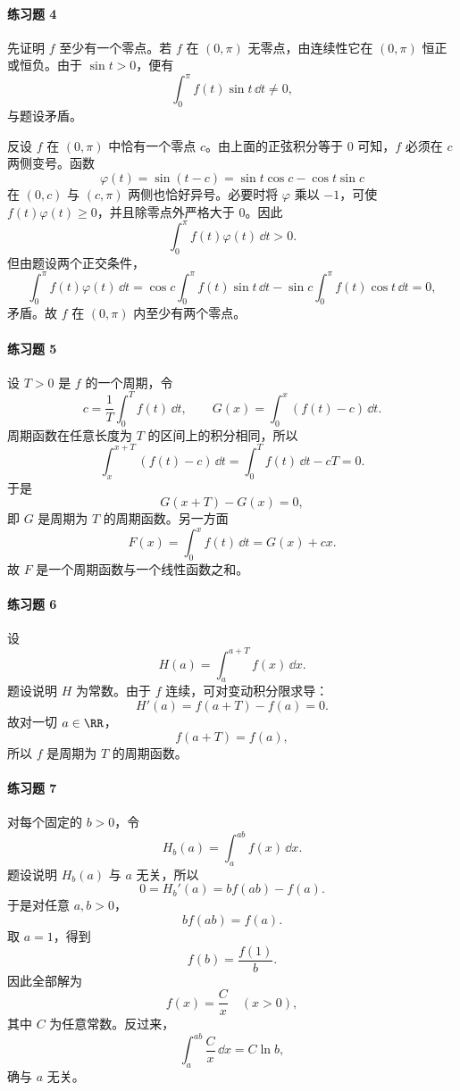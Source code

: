 \paragraph{练习题 4}
\begin{xsolution}
先证明 $f$ 至少有一个零点。若 $f$ 在 $(0,\pi)$ 无零点，由连续性它在 $(0,\pi)$ 恒正或恒负。由于 $\sin t>0$，便有
\[
  \int_0^\pi f(t)\sin t\,\dd t\ne0,
\]
与题设矛盾。

反设 $f$ 在 $(0,\pi)$ 中恰有一个零点 $c$。由上面的正弦积分等于 $0$ 可知，$f$ 必须在 $c$ 两侧变号。函数
\[
  \varphi(t)=\sin(t-c)=\sin t\cos c-\cos t\sin c
\]
在 $(0,c)$ 与 $(c,\pi)$ 两侧也恰好异号。必要时将 $\varphi$ 乘以 $-1$，可使 $f(t)\varphi(t)\geqslant0$，并且除零点外严格大于 $0$。因此
\[
  \int_0^\pi f(t)\varphi(t)\,\dd t>0.
\]
但由题设两个正交条件，
\[
  \int_0^\pi f(t)\varphi(t)\,\dd t
  =\cos c\int_0^\pi f(t)\sin t\,\dd t
  -\sin c\int_0^\pi f(t)\cos t\,\dd t=0,
\]
矛盾。故 $f$ 在 $(0,\pi)$ 内至少有两个零点。
\end{xsolution}

\paragraph{练习题 5}
\begin{xsolution}
设 $T>0$ 是 $f$ 的一个周期，令
\[
  c=\frac1T\int_0^T f(t)\,\dd t,
  \qquad
  G(x)=\int_0^x(f(t)-c)\,\dd t.
\]
周期函数在任意长度为 $T$ 的区间上的积分相同，所以
\[
  \int_x^{x+T}(f(t)-c)\,\dd t
  =\int_0^T f(t)\,\dd t-cT=0.
\]
于是
\[
  G(x+T)-G(x)=0,
\]
即 $G$ 是周期为 $T$ 的周期函数。另一方面
\[
  F(x)=\int_0^x f(t)\,\dd t=G(x)+cx.
\]
故 $F$ 是一个周期函数与一个线性函数之和。
\end{xsolution}

\paragraph{练习题 6}
\begin{xsolution}
设
\[
  H(a)=\int_a^{a+T}f(x)\,\dd x.
\]
题设说明 $H$ 为常数。由于 $f$ 连续，可对变动积分限求导：
\[
  H'(a)=f(a+T)-f(a)=0.
\]
故对一切 $a\in\RR$，
\[
  f(a+T)=f(a),
\]
所以 $f$ 是周期为 $T$ 的周期函数。
\end{xsolution}

\paragraph{练习题 7}
\begin{xsolution}
对每个固定的 $b>0$，令
\[
  H_b(a)=\int_a^{ab}f(x)\,\dd x.
\]
题设说明 $H_b(a)$ 与 $a$ 无关，所以
\[
  0=H_b'(a)=b f(ab)-f(a).
\]
于是对任意 $a,b>0$，
\[
  b f(ab)=f(a).
\]
取 $a=1$，得到
\[
  f(b)=\frac{f(1)}b.
\]
因此全部解为
\[
  \boxed{f(x)=\frac Cx\quad(x>0)},
\]
其中 $C$ 为任意常数。反过来，
\[
  \int_a^{ab}\frac Cx\,\dd x=C\ln b,
\]
确与 $a$ 无关。
\end{xsolution}

